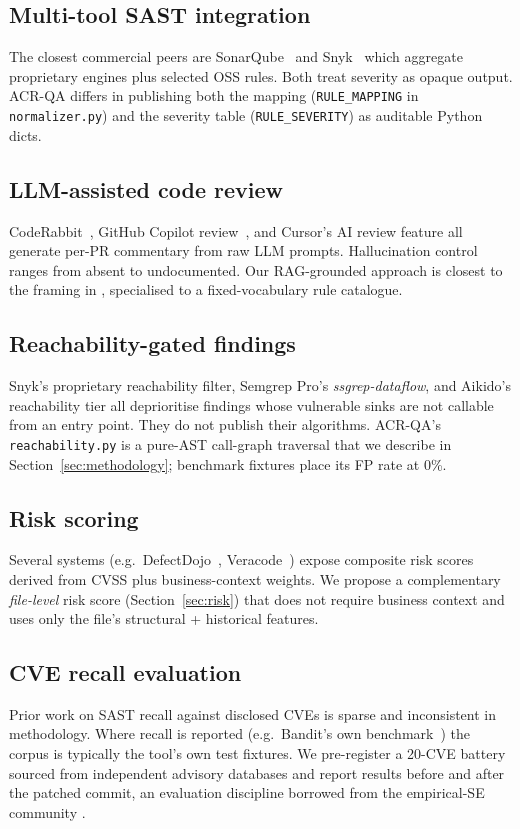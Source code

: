 \documentclass[conference]{IEEEtran}
\begin{document}
\subsection{Multi-tool SAST integration}
The closest commercial peers are SonarQube~\cite{sonarqube} and
Snyk~\cite{snyk} which aggregate proprietary engines plus selected OSS rules.
Both treat severity as opaque output. ACR-QA differs in publishing both the
mapping (\texttt{RULE\_MAPPING} in \texttt{normalizer.py}) and the severity
table (\texttt{RULE\_SEVERITY}) as auditable Python dicts.

\subsection{LLM-assisted code review}
CodeRabbit~\cite{coderabbit}, GitHub Copilot review~\cite{copilot2024audit},
and Cursor's AI review feature all generate per-PR commentary from raw LLM
prompts. Hallucination control ranges from absent to undocumented. Our
RAG-grounded approach is closest to the framing in
\cite{lewis2020retrieval}, specialised to a fixed-vocabulary rule catalogue.

\subsection{Reachability-gated findings}
Snyk's proprietary reachability filter, Semgrep Pro's
\emph{ssgrep-dataflow}, and Aikido's reachability tier all
deprioritise findings whose vulnerable sinks are not callable from an entry
point. They do not publish their algorithms. ACR-QA's
\texttt{reachability.py} is a pure-AST call-graph traversal that we describe
in Section~\ref{sec:methodology}; benchmark fixtures place its FP rate at 0\%.

\subsection{Risk scoring}
Several systems (e.g.\ DefectDojo~\cite{defectdojo}, Veracode~\cite{veracode})
expose composite risk scores derived from CVSS plus business-context weights.
We propose a complementary \emph{file-level} risk score
(Section~\ref{sec:risk}) that does not require business context and uses only
the file's structural + historical features.

\subsection{CVE recall evaluation}
Prior work on SAST recall against disclosed CVEs is sparse and inconsistent
in methodology. Where recall is reported (e.g.\ Bandit's own
benchmark~\cite{bandit_eval}) the corpus is typically the tool's own test
fixtures. We pre-register a 20-CVE battery sourced from independent advisory
databases and report results before and after the patched commit, an
evaluation discipline borrowed from the empirical-SE community
\cite{ko2015practical}.
\end{document}
